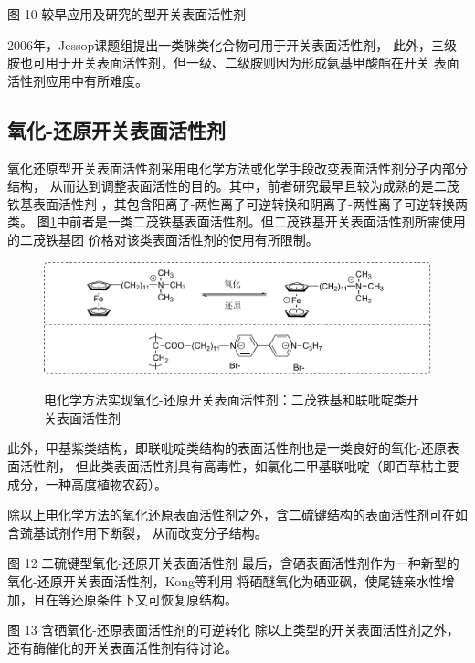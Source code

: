 \documentclass[bachelor,winfonts]{jnuthesis} %
\begin{document}
    图 10 较早应用及研究的型开关表面活性剂
    
    2006年，Jessop课题组\cite{liu2006science}提出一类脒类化合物可用于开关表面活性剂，
    此外，三级胺也可用于开关表面活性剂，但一级、二级胺则因为形成氨基甲酸酯在开关
    表面活性剂应用中有所难度\cite{jessop2012}。
    \subsection{氧化-还原开关表面活性剂}
    氧化还原型开关表面活性剂采用电化学方法或化学手段改变表面活性剂分子内部分结构，
    从而达到调整表面活性的目的。其中，前者研究最早且较为成熟的是二茂铁基表面活性剂
    ，其包含阳离子-两性离子可逆转换和阴离子-两性离子可逆转换两类\cite{李云霞2011}。
    图\ref{fig:switchable-redox-cp2fe}中前者是一类二茂铁基表面活性剂。但二茂铁基开关表面活性剂所需使用的二茂铁基团
    价格对该类表面活性剂的使用有所限制。
    
    \begin{figure}[htbp]
        \centering
        \includegraphics[width= \textwidth]{Figure/switchable-cp2fe.pdf}\\
        \caption{电化学方法实现氧化-还原开关表面活性剂：二茂铁基和联吡啶类开关表面活性剂}\label{fig:switchable-redox-cp2fe}
    \end{figure}
   
    此外，甲基紫类结构，即联吡啶类结构的表面活性剂也是一类良好的氧化-还原表面活性剂，
    但此类表面活性剂具有高毒性，如氯化二甲基联吡啶（即百草枯主要成分，一种高度植物农药）。
    
    除以上电化学方法的氧化还原表面活性剂之外，含二硫键结构的表面活性剂可在如含巯基试剂作用下断裂，
    从而改变分子结构。
    
    图 12 二硫键型氧化-还原开关表面活性剂
    最后，含硒表面活性剂作为一种新型的氧化-还原开关表面活性剂，Kong等\cite{kong2016redox}利用
    将硒醚氧化为硒亚砜，使尾链亲水性增加，且在等还原条件下又可恢复原结构。
    
    图 13 含硒氧化-还原表面活性剂的可逆转化\cite{kong2016redox}
    除以上类型的开关表面活性剂之外，还有酶催化\cite{ku2011}的开关表面活性剂有待讨论。
    
\end{document}
